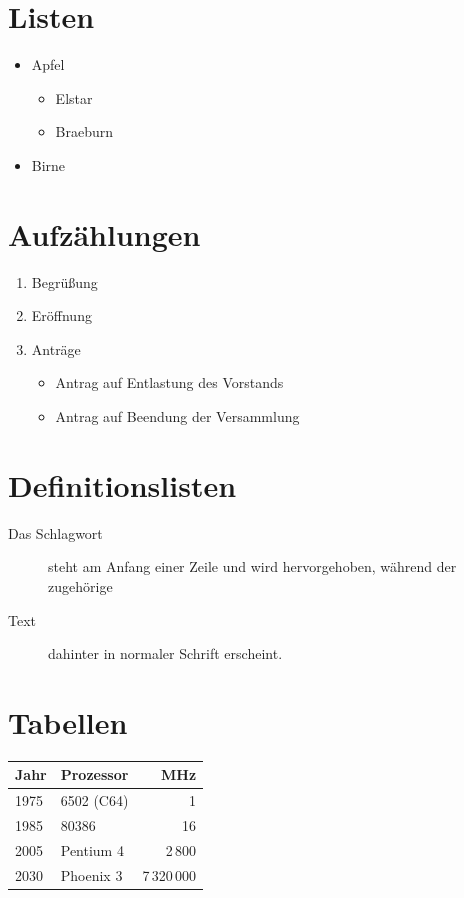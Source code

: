 \documentclass{scrartcl}
\begin{document}
  \section{Listen}

  \begin{itemize}
    \item Apfel
      \begin{itemize}
        \item Elstar
        \item Braeburn
      \end{itemize}
    \item Birne
  \end{itemize}

  \section{Aufzählungen}

  \begin{enumerate}
    \item Begrüßung
    \item Eröffnung
    \item Anträge
      \begin{itemize}
        \item Antrag auf Entlastung des Vorstands
        \item Antrag auf Beendung der Versammlung
      \end{itemize}
  \end{enumerate}

  \section{Definitionslisten}

  \begin{description}
    \item[Das Schlagwort] steht am Anfang
      einer Zeile und wird hervorgehoben,
      während der zugehörige
    \item[Text] dahinter in normaler
      Schrift erscheint.
  \end{description}

  \section{Tabellen}

  \begin{tabular}{l|lr}
    \textbf{Jahr} & \textbf{Prozessor} &
        \textbf{MHz} \\
    \hline
    1975 & 6502 (C64) & 1 \\
    1985 & 80386 & 16 \\
    2005 & Pentium 4 & 2\,800 \\
    2030 & Phoenix 3 & 7\,320\,000
  \end{tabular}
\end{document}
